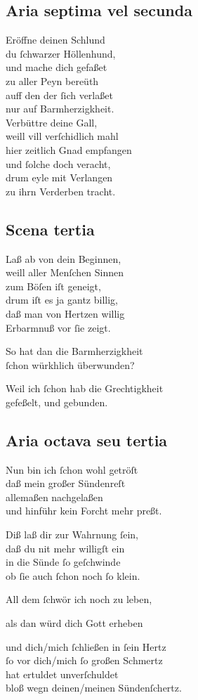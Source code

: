\documentclass{ees}
\newenvironment{lyrics}[1]{%
  \subsection{#1}\nopagebreak%
  \begin{lyricslist}%
  \let\voice\item%
}{%
  \end{lyricslist}%
}
\newcommand\voiceSohn{\voice[Sohn]}
\newcommand\voiceBarmherzigkeit{\voice[Barmh.]}
\newcommand\voiceGerechtigkeit{\voice[Gerecht.]}
\begin{document}
\begin{lyrics}{Aria septima vel secunda}
  \voiceGerechtigkeit
  Eröffne deinen Schlund\\
  du ſchwarzer Höllenhund,\\
  und mache dich gefaßet\\
  zu aller Peyn bereüth\\
  auff den der ſich verlaßet\\
  nur auf Barmherzigkheit.\\[1ex]
  Verbüttre deine Gall,\\
  weill vill verſchidlich mahl\\
  hier zeitlich Gnad empfangen\\
  und ſolche doch veracht,\\
  drum eyle mit Verlangen\\
  zu ihrn Verderben tracht.
\end{lyrics}

\begin{lyrics}{Scena tertia}
  \voiceBarmherzigkeit
  Laß ab von dein Beginnen,\\
  weill aller Menſchen Sinnen\\
  zum Böſen iſt geneigt,\\
  drum iſt es ja gantz billig,\\
  daß man von Hertzen willig\\
  Erbarmnuß vor ſie zeigt.

  \voiceSohn
  So hat dan die Barmherzigkheit\\
  ſchon würkhlich überwunden?

  \voiceBarmherzigkeit
  Weil ich ſchon hab die Grechtigkheit\\
  gefeßelt, und gebunden.
\end{lyrics}

\begin{lyrics}{Aria octava seu tertia}
  \voiceSohn
  Nun bin ich ſchon wohl getröſt\\
  daß mein großer Sündenreſt\\
  allemaßen nachgelaßen\\
  und hinführ kein Forcht mehr preßt.

  \voiceBarmherzigkeit
  Diß laß dir zur Wahrnung ſein,\\
  daß du nit mehr willigſt ein\\
  in die Sünde ſo geſchwinde\\
  ob ſie auch ſchon noch ſo klein.

  \voiceSohn
  All dem ſchwör ich noch zu leben,

  \voiceBarmherzigkeit
  als dan würd dich Gott erheben

  \voice[beyde]
  und dich/mich ſchließen in ſein Hertz\\
  ſo vor dich/mich ſo großen Schmertz\\
  hat ertuldet unverſchuldet\\
  bloß wegn deinen/meinen Sündenſchertz.
\end{lyrics}
\end{document}

